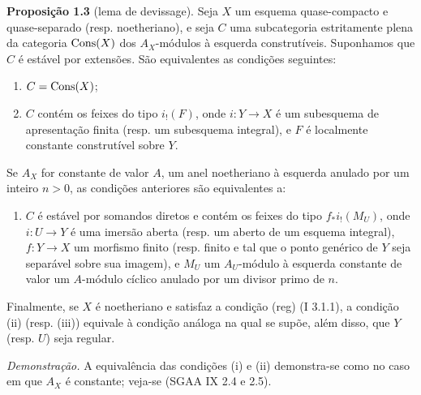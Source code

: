\textbf{Proposição 1.3} (lema de devissage). Seja $X$ um esquema quase-compacto e quase-separado (resp. noetheriano), e seja $C$ uma subcategoria estritamente plena da categoria $\operatorname{Cons}(X)$ dos $A_X$-módulos à esquerda construtíveis. Suponhamos que $C$ é estável por extensões. São equivalentes as condições seguintes:
\begin{enumerate}[label=(\roman*)]
\item $C=\operatorname{Cons}(X)$;
\item $C$ contém os feixes do tipo $i_!(F)$, onde $i:Y\to X$ é um subesquema de apresentação finita (resp. um subesquema integral), e $F$ é localmente constante construtível sobre $Y$.
\end{enumerate}
Se $A_X$ for constante de valor $A$, um anel noetheriano à esquerda anulado por um inteiro $n>0$, as condições anteriores são equivalentes a:
\begin{enumerate}[label=(\roman*),start=3]
\item $C$ é estável por somandos diretos e contém os feixes do tipo $f_*i_!(M_U)$, onde $i:U\to Y$ é uma imersão aberta (resp. um aberto de um esquema integral), $f:Y\to X$ um morfismo finito (resp. finito e tal que o ponto genérico de $Y$ seja separável sobre sua imagem), e $M_U$ um $A_U$-módulo à esquerda constante de valor um $A$-módulo cíclico anulado por um divisor primo de $n$.
\end{enumerate}
Finalmente, se $X$ é noetheriano e satisfaz a condição (reg) (I 3.1.1), a condição (ii) (resp. (iii)) equivale à condição análoga na qual se supõe, além disso, que $Y$ (resp. $U$) seja regular.

\emph{Demonstração.} A equivalência das condições (i) e (ii) demonstra-se como no caso em que $A_X$ é constante; veja-se (SGAA IX 2.4 e 2.5).

